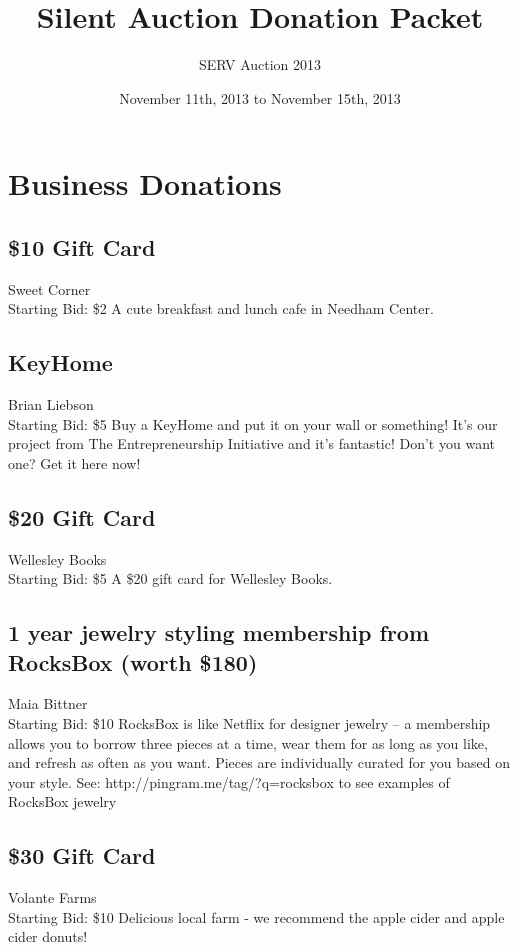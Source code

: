 \documentclass[11pt]{article}
\title{Silent Auction Donation Packet}
\author{SERV Auction 2013}
\date{November 11th, 2013 to November 15th, 2013}
\begin{document}
\maketitle
\section{Business Donations}
\subsection{\$10 Gift Card}
Sweet Corner
\\
Starting Bid: \$2
\newline
A cute breakfast and lunch cafe in Needham Center.
\subsection{KeyHome}
Brian Liebson
\\
Starting Bid: \$5
\newline
Buy a KeyHome and put it on your wall or something! It's our project from The Entrepreneurship Initiative and it's fantastic! Don't you want one? Get it here now!
\subsection{\$20 Gift Card}
Wellesley Books
\\
Starting Bid: \$5
\newline
A \$20 gift card for Wellesley Books.
\subsection{1 year jewelry styling membership from RocksBox (worth \$180)}
Maia Bittner
\\
Starting Bid: \$10
\newline
RocksBox is like Netflix for designer jewelry -- a membership allows you to borrow three pieces at a time, wear them for as long as you like, and refresh as often as you want. Pieces are individually curated for you based on your style. See: http://pingram.me/tag/?q=rocksbox to see examples of RocksBox jewelry
\subsection{\$30 Gift Card}
Volante Farms
\\
Starting Bid: \$10
\newline
Delicious local farm - we recommend the apple cider and apple cider donuts!
\end{document}
